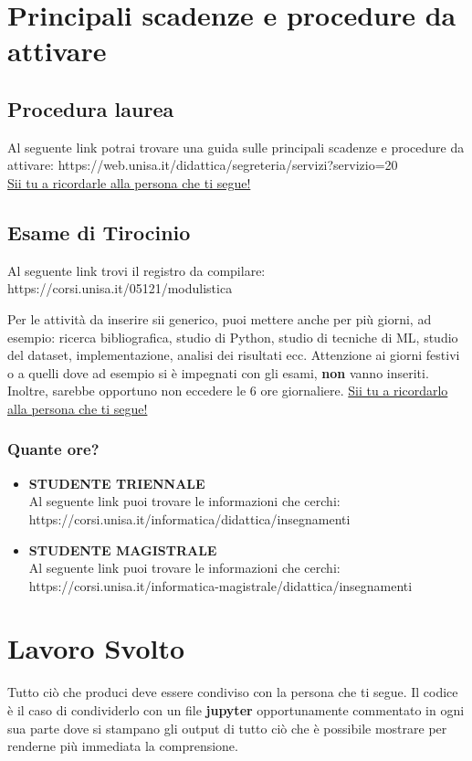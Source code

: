 \section{Principali scadenze e procedure da attivare}
\subsection{Procedura laurea}
Al seguente link potrai trovare una guida sulle principali scadenze e procedure da attivare:
https://web.unisa.it/didattica/segreteria/servizi?servizio=20 \\
\underline {Sii tu a ricordarle alla persona che ti segue!}
\subsection{Esame di Tirocinio}

Al seguente link trovi il registro da compilare: https://corsi.unisa.it/05121/modulistica 

\noindent Per le attività da inserire sii generico, puoi mettere anche per più giorni, ad esempio: ricerca bibliografica, studio di Python, studio di tecniche di ML, studio del dataset, implementazione, analisi dei risultati ecc. Attenzione ai giorni festivi o a quelli dove ad esempio si è impegnati con gli esami,  \textbf{non} vanno inseriti. Inoltre, sarebbe opportuno non eccedere le 6 ore giornaliere. \underline {Sii tu a ricordarlo alla persona che ti segue!}

\subsubsection{Quante ore?}
\begin{itemize}
    \item \textbf{STUDENTE TRIENNALE}\\
    Al seguente link puoi trovare le informazioni che cerchi:\\
https://corsi.unisa.it/informatica/didattica/insegnamenti

\item \textbf{STUDENTE MAGISTRALE}\\
    Al seguente link puoi trovare le informazioni che cerchi:\\
https://corsi.unisa.it/informatica-magistrale/didattica/insegnamenti

\end{itemize}

\section{Lavoro Svolto}
Tutto ciò che produci deve essere condiviso con la persona che ti segue. Il codice è il caso di condividerlo con un file \textbf{jupyter} opportunamente commentato in ogni sua parte dove si stampano gli output di tutto ciò che è possibile mostrare per renderne più immediata la comprensione. 



